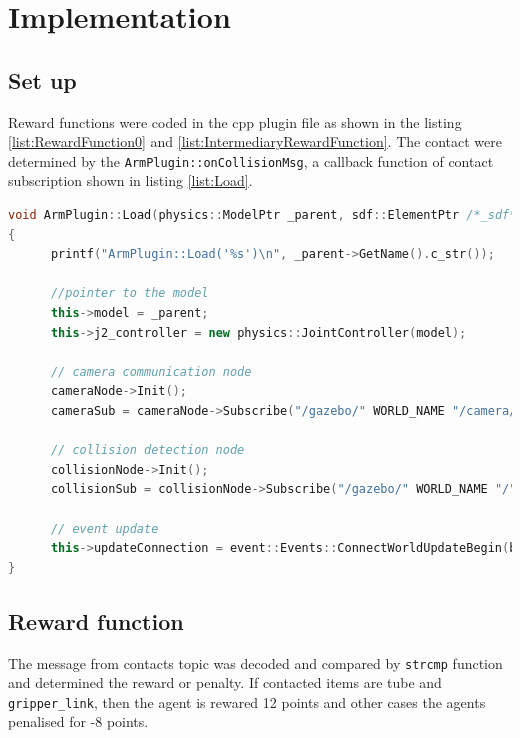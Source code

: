 \documentclass[10pt,journal,compsoc]{IEEEtran}
\begin{document}
\section{Implementation}
\subsection{Set up}
Reward functions were coded in the cpp plugin file as shown in the listing \ref{list:RewardFunction0} and \ref{list:IntermediaryRewardFunction}.
The contact were determined by the \verb!ArmPlugin::onCollisionMsg!, a callback function of contact subscription shown in listing \ref{list:Load}.

\begin{lstlisting}[language=C++, caption={ArmPlugin::Load},label={list:Load}]
void ArmPlugin::Load(physics::ModelPtr _parent, sdf::ElementPtr /*_sdf*/)
{
      printf("ArmPlugin::Load('%s')\n", _parent->GetName().c_str());
      
      //pointer to the model
      this->model = _parent;
      this->j2_controller = new physics::JointController(model);
      
      // camera communication node
      cameraNode->Init();
      cameraSub = cameraNode->Subscribe("/gazebo/" WORLD_NAME "/camera/link/camera/image", &ArmPlugin::onCameraMsg, this);
      
      // collision detection node
      collisionNode->Init();
      collisionSub = collisionNode->Subscribe("/gazebo/" WORLD_NAME "/" PROP_NAME "/tube_link/my_contact", &ArmPlugin::onCollisionMsg, this);
      
      // event update
      this->updateConnection = event::Events::ConnectWorldUpdateBegin(boost::bind(&ArmPlugin::OnUpdate, this, _1));
}
\end{lstlisting}

\subsection{Reward function}
The message from contacts topic was decoded and compared by \verb!strcmp! function and determined the reward or penalty. If contacted items are tube and \verb!gripper_link!, then the agent is rewared 12 points and other cases the agents penalised for -8 points.
\end{document}
